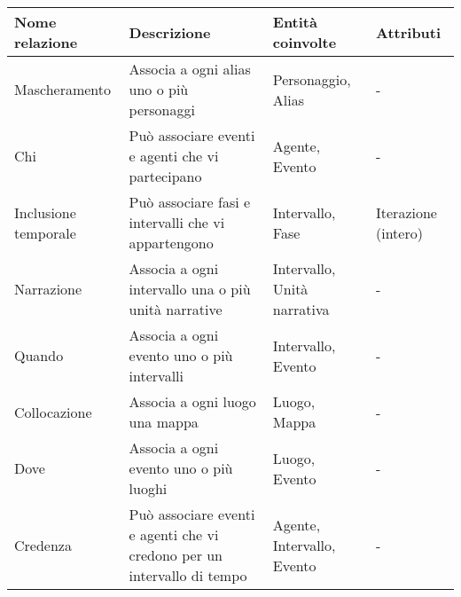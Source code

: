 \documentclass{article}
\begin{document}
\begin{center}\begin{tabular}{|p{}|p{}|p{}|p{}|}
		\hline
		\textbf{Nome relazione} & \textbf{Descrizione}                                                    & \textbf{Entità coinvolte}   & \textbf{Attributi}  \\
		\hline
		Mascheramento           & Associa a ogni alias uno o più personaggi                               & Personaggio, Alias          & -                   \\
		\hline
		Chi                     & Può associare eventi e agenti che vi partecipano                        & Agente, Evento              & -                   \\
		\hline
		Inclusione temporale    & Può associare fasi e intervalli che vi appartengono                     & Intervallo, Fase            & Iterazione (intero) \\
		\hline
		Narrazione              & Associa a ogni intervallo una o più unità narrative                     & Intervallo, Unità narrativa & -                   \\
		\hline
		Quando                  & Associa a ogni evento uno o più intervalli                              & Intervallo, Evento          & -                   \\
		\hline
		Collocazione            & Associa a ogni luogo una mappa                                          & Luogo, Mappa                & -                   \\
		\hline
		Dove                    & Associa a ogni evento uno o più luoghi                                  & Luogo, Evento               & -                   \\
		\hline
		Credenza                & Può associare eventi e agenti che vi credono per un intervallo di tempo & Agente, Intervallo, Evento  & -                   \\
		\hline
	\end{tabular}\end{center}
\end{document}
